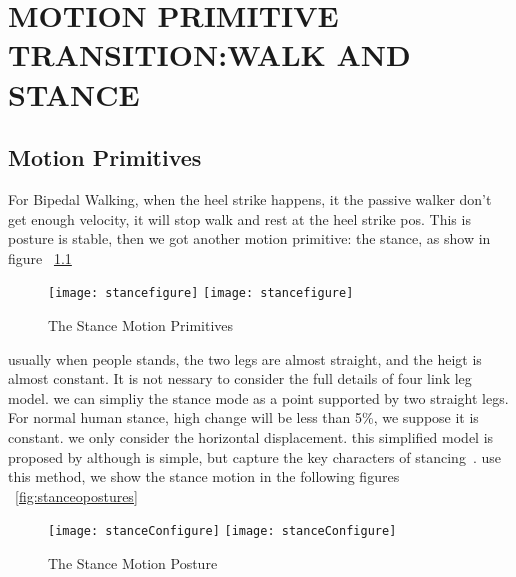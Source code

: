 
\chapter{MOTION PRIMITIVE TRANSITION:WALK AND STANCE}
\label{chap:stance}
\ifpdf
    \graphicspath{{WalkStance/WalkstanceFigs/PNG/}{WalkStance/WalkStanceFigs/PDF/}{WalkStance/WalkStanceFigs/}}
\else
    \graphicspath{{WalkStance/WalkStanceFigs/EPS/}{WalkStance/WalkStanceFigs/}}
\fi



\section{Motion Primitives}
For Bipedal Walking, when the heel strike happens, it the passive walker don't get enough velocity, it will stop walk and rest at the heel strike pos.
This is posture is stable, then we got another motion primitive: the stance, as show in figure ~\ref{fig:bipedalstance}



\begin{figure}[!htbp]
  \begin{center}
    \leavevmode
    \ifpdf
      \texttt{[image: stancefigure]}
    \else
      \texttt{[image: stancefigure]}
    \fi
    \caption{The Stance Motion Primitives}
    \label{fig:bipedalstance}
\end{center}
\end{figure}



usually when people stands, the two legs are almost straight, and the heigt is almost constant.
It is not nessary to consider the full details of four link leg model.
we can simpliy the stance mode as a point supported by two straight legs. 
For normal human stance, high change will be less than 5\%, we suppose it is constant.
we only consider the horizontal displacement.
this simplified model is proposed by although is simple, but capture the key characters of stancing~\citep{stephens2009modeling}.
use this method, we show the stance motion in the following figures ~\ref{fig:stanceopostures}

\begin{figure}[!htbp]
  \begin{center}
    \leavevmode
    \ifpdf
      \texttt{[image: stanceConfigure]}
    \else
      \texttt{[image: stanceConfigure]}
    \fi
    \caption{The Stance Motion Posture}
    \label{fig:stancepostures}
\end{center}
\end{figure}

